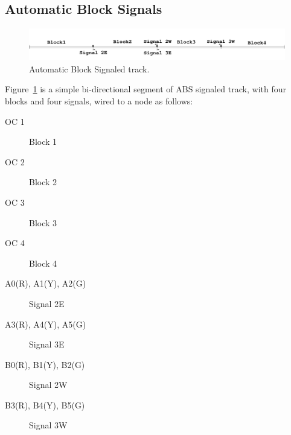 %
%
%
%
% 
%
%
%
%
%
% 
%

\subsection{Automatic Block Signals}
\label{sect-appl:ABS}

\begin{figure}[hbpt]\begin{centering}%
\includegraphics[width=5in]{ABSTrack.png}
\caption{Automatic Block Signaled track.}
\label{fig:ABSTrack}
\end{centering}\end{figure}

Figure~\ref{fig:ABSTrack} is a simple bi-directional segment of ABS signaled 
track, with four blocks and four signals, wired to a node as follows:

\begin{description}
\item [OC 1] Block 1
\item [OC 2] Block 2
\item [OC 3] Block 3
\item [OC 4] Block 4
\item [A0(R), A1(Y), A2(G)] Signal 2E
\item [A3(R), A4(Y), A5(G)] Signal 3E
\item [B0(R), B1(Y), B2(G)] Signal 2W
\item [B3(R), B4(Y), B5(G)] Signal 3W
\end{description}

